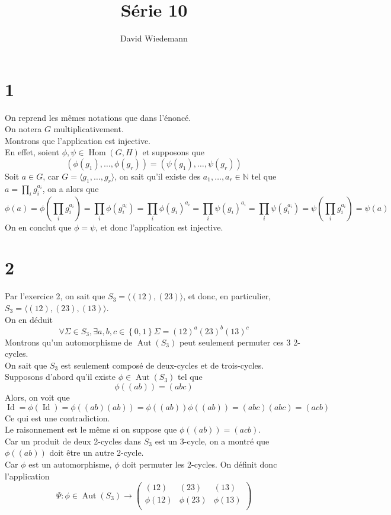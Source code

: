 \documentclass[11pt, a4paper]{article}
\DeclareMathOperator*{\om}{Hom}
\DeclareMathOperator*{\aut}{Aut}
\DeclareMathOperator*{\id}{Id}
\begin{document}
\title{Série 10}
\author{David Wiedemann}
\maketitle
\section*{1}
On reprend les mêmes notations que dans l'énoncé.\\
On notera $G$ multiplicativement.\\
Montrons que l'application est injective.\\
En effet, soient $\phi, \psi \in \om(G,H ) $ et supposons que
\[ 
	( \phi( g_1) , \ldots, \phi( g_r) ) = ( \psi( g_1) , \ldots, \psi( g_r) )
\]
Soit $a \in G$, car $G= \langle g_1, \ldots, g_r \rangle$, on sait qu'il existe des $a_1, \ldots, a_r \in \mathbb{N}$ tel que $a= \prod_i g_i^{a_i}$, on a alors que
\[ 
	\phi( a) = \phi\left( \prod_i g_i ^{a_i}\right) = \prod_i \phi( g_i ^{a_i} )  = \prod_i \phi( g_i) ^{a_i} = \prod_i \psi( g_i) ^{a_i}= \prod_i \psi\left( g_i^{a_i}\right) = \psi\left( \prod_i g_i ^{a_i}\right) = \psi( a) 
\]
On en conclut que $\phi= \psi$, et donc l'application est injective.
\section*{2}
Par l'exercice 2, on sait que $S_3 = \langle ( 12) , ( 23) \rangle$, et donc, en particulier, $S_3 = \langle ( 12) , ( 23), ( 13)\rangle $.\\
On en déduit
\[ 
	\forall \Sigma \in S_3, \exists a,b,c \in  \left\{ 0,1 \right\}  \Sigma = ( 12) ^{a} ( 23) ^{b} ( 13) ^{c}
\]
Montrons qu'un automorphisme de $\aut( S_3) $ peut seulement permuter ces 3 2-cycles.\\
On sait que $S_3$ est seulement composé de deux-cycles et de trois-cycles.\\
Supposons d'abord qu'il existe $\phi \in \aut( S_3) $ tel que
\[ 
	\phi( ( ab) ) = ( abc) 
\]
Alors, on voit que
\[ 
	\id = \phi( \id) = \phi( ( ab) ( ab) ) = \phi( ( ab) ) \phi( ( ab )) = ( abc) ( abc) = ( acb) 
\]
Ce qui est une contradiction.\\
Le raisonnement est le même si on suppose que $\phi( ( ab) ) = ( acb) $.\\
Car un produit de deux 2-cycles dans $S_3$ est un 3-cycle, on a montré que $\phi( ( ab )) $ doit être un autre 2-cycle.\\
Car $\phi$ est un automorphisme, $\phi$ doit permuter les 2-cycles.
On définit donc l'application
\[ 
	\Psi: \phi\in \aut( S_3) \to 
	\begin{pmatrix}
		( 12) & ( 23) & ( 13) \\
		\phi( 12) & \phi( 23) & \phi( 13) \\
	\end{pmatrix}
\]
\end{document}
